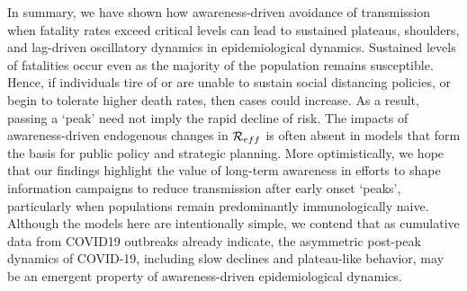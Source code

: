 In summary, we have shown how awareness-driven avoidance of transmission
when fatality rates exceed critical levels can lead
to sustained plateaus, shoulders, and lag-driven oscillatory dynamics
in epidemiological dynamics.
Sustained levels of fatalities occur even as the majority
of the population remains
susceptible. Hence, if individuals tire of or are unable
to sustain social
distancing policies, or begin to tolerate higher death rates, then cases 
could increase. 
As a result, passing a `peak' need not imply
the rapid decline of risk. The impacts of awareness-driven
endogenous changes in ${\cal{R}}_{eff}$ is often
absent in models that form the basis for public policy and strategic planning.
More optimistically, we hope that our findings
highlight the value of long-term awareness 
in efforts to shape information campaigns
to reduce transmission after early onset `peaks', particularly
when populations remain predominantly immunologically naive.
Although the models here are intentionally simple,
we contend that as cumulative data from COVID19 outbreaks already
indicate, the asymmetric post-peak dynamics of COVID-19, including
slow declines and plateau-like behavior, may be an emergent
property of awareness-driven epidemiological dynamics.
